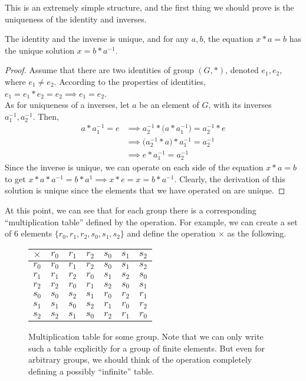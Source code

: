   This is an extremely simple structure, and the first thing we should prove is the uniqueness of the identity and inverses. 

  \begin{lemma}
    \label{thm:unique_add_inverse}
    The identity and the inverse is unique, and for any $a, b$, the equation $x*a = b$ has the unique solution $x = b* a^{-1}$.
  \end{lemma}
  \begin{proof}
     Assume that there are two identities of group $(G,*)$, denoted $e_{1}, e_{2}$, where $e_{1} \neq e_{2}$. According to the properties of identities, $e_{1} = e_{1} * e_{2} = e_{2} \implies e_{1} = e_{2}$. \\
    As for uniqueness of a inverses, let $a$ be an element of $G$, with its inverses $a_{1}^{-1}, a_{2}^{-1}$. Then, 
    \begin{align*}
      a * a_{1}^{-1} = e & \implies a_{2}^{-1} * \Big(a * a_{1}^{-1} \Big)= a_{2}^{-1} * e \\
       & \implies \Big(a_{2}^{-1} * a \Big) * a_{1}^{-1} = a_{2}^{-1} \\
       & \implies e * a_{1}^{-1} = a_{2}^{-1}
    \end{align*}
    Since the inverse is unique, we can operate on each side of the equation $x*a = b$ to get $x*a*a^{-1} = b*a^{1} \implies x * e = x = b*a^{-1}$. Clearly, the derivation of this solution is unique since the elements that we have operated on are unique.
  \end{proof} 
  
  At this point, we can see that for each group there is a corresponding ``multiplication table'' defined by the operation. For example, we can create a set of $6$ elements $\{r_0, r_1, r_2, s_0, s_1, s_2\}$ and define the operation $\times$ as the following. 

  \begin{figure}[H]
    \centering 
    \begin{tabular}{c|cccccc}
      $\times$ & $r_0$ & $r_1$ & $r_2$ & $s_0$ & $s_1$ & $s_2$ \\
      \hline
      $r_0$ & $r_0$ & $r_1$ & $r_2$ & $s_0$ & $s_1$ & $s_2$ \\
      $r_1$ & $r_1$ & $r_2$ & $r_0$ & $s_1$ & $s_2$ & $s_0$ \\
      $r_2$ & $r_2$ & $r_0$ & $r_1$ & $s_2$ & $s_0$ & $s_1$ \\
      $s_0$ & $s_0$ & $s_2$ & $s_1$ & $r_0$ & $r_2$ & $r_1$ \\
      $s_1$ & $s_1$ & $s_0$ & $s_2$ & $r_1$ & $r_0$ & $r_2$ \\
      $s_2$ & $s_2$ & $s_1$ & $s_0$ & $r_2$ & $r_1$ & $r_0$ \\
    \end{tabular}
    \caption{Multiplication table for some group. Note that we can only write such a table explicitly for a group of finite elements. But even for arbitrary groups, we should think of the operation completely defining a possibly ``infinite'' table.} 
  \end{figure} 

